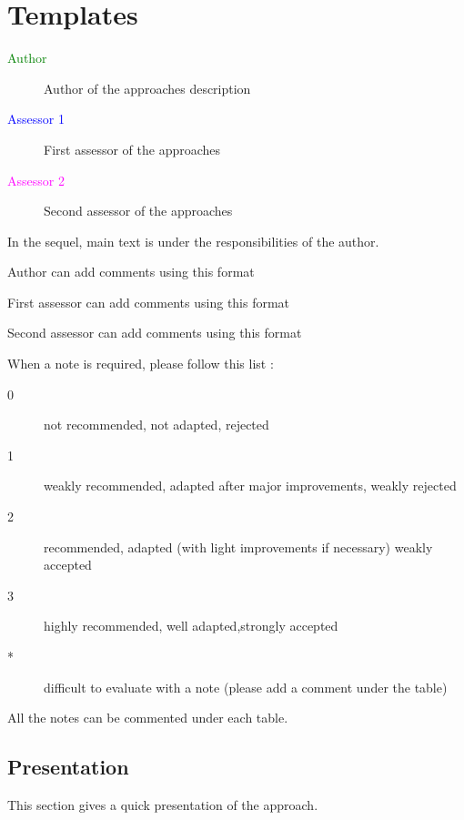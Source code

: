 \chapter{Templates}

\begin{description}
\item[\textcolor{green}{Author}] Author of the approaches description  
\item[\textcolor{blue}{Assessor 1}] First assessor of the approaches 
\item[\textcolor{magenta}{Assessor 2}] Second assessor of the approaches 
\end{description}

In the sequel, main text is under the responsibilities of the author.

\begin{author_comment}
Author can add comments using this format
\end{author_comment}

\begin{assessor1}
First assessor can add comments using this format
\end{assessor1}

\begin{assessor2}
Second assessor can add comments using this format
\end{assessor2}

When a note is required, please follow this list :
\begin{description}
\item[0] not recommended, not adapted, rejected
\item[1] weakly recommended, adapted after major improvements, weakly rejected
\item[2] recommended, adapted (with light improvements if necessary)  weakly accepted
\item[3] highly recommended, well adapted,strongly accepted
\item[*] difficult to evaluate with a note (please add a comment under the table)
\end{description}

All the notes can be commented under each table.

\section{Presentation}

This section gives a quick presentation of the approach.

